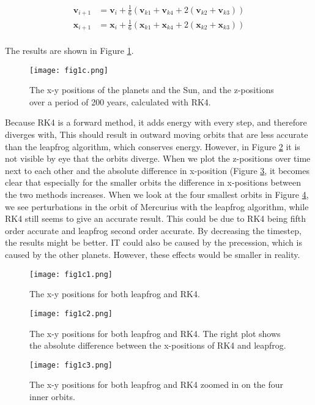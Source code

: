 \begin{align}
    \mathbf{v}_{i+1} &= \mathbf{v}_{i} + \frac{1}{6} (\mathbf{v}_{k1} + \mathbf{v}_{k4} + 2(\mathbf{v}_{k2} + \mathbf{v}_{k3})) \\
    \mathbf{x}_{i+1} &= \mathbf{x}_{i} + \frac{1}{6} (\mathbf{x}_{k1} + \mathbf{x}_{k4} + 2(\mathbf{x}_{k2} + \mathbf{x}_{k3})) \\
\end{align}

The results are shown in Figure \ref{fig:1c}.
\begin{figure}[h!]
  \centering
  \texttt{[image: fig1c.png]}
  \caption{The x-y positions of the planets and the Sun, and the z-positions over a period of 200 years, calculated with RK4.}
  \label{fig:1c}
\end{figure}

Because RK4 is a forward method, it adds energy with every step, and therefore diverges with, This should result in outward moving orbits that are less accurate than the leapfrog algorithm, which conserves energy. However, in Figure \ref{fig:1c1} it is not visible by eye that the orbits diverge. When we plot the z-positions over time next to each other and the absolute difference in x-position (Figure \ref{fig:1c2}, it becomes clear that especially for the smaller orbits the difference in x-positions between the two methods increases. When we look at the four smallest orbits in Figure \ref{fig:1c3}, we see perturbations in the orbit of Mercurius with the leapfrog algorithm, while RK4 still seems to give an accurate result. This could be due to RK4 being fifth order accurate and leapfrog second order accurate. By decreasing the timestep, the results might be better. IT could also be caused by the precession, which is caused by the other planets. However, these effects would be smaller in reality. 

\begin{figure}[h!]
  \centering
  \texttt{[image: fig1c1.png]}
  \caption{The x-y positions for both leapfrog and RK4.}
  \label{fig:1c1}
\end{figure}

\begin{figure}[h!]
  \centering
  \texttt{[image: fig1c2.png]}
  \caption{The x-y positions for both leapfrog and RK4. The right plot shows the absolute difference between the x-positions of RK4 and leapfrog.}
  \label{fig:1c2}
\end{figure}

\begin{figure}[h!]
  \centering
  \texttt{[image: fig1c3.png]}
  \caption{The x-y positions for both leapfrog and RK4 zoomed in on the four inner orbits.}
  \label{fig:1c3}
\end{figure}
